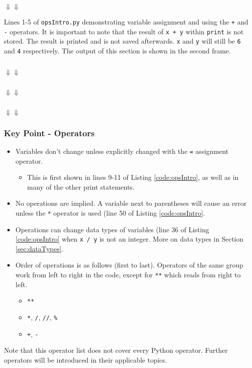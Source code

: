 \documentclass{book}
\newcommand{\pythonAndShellSub}[8]{
\usemintedstyle{autumn}
    \begin{listing}[htb]
 	   \begin{mdframed}[backgroundcolor=codebg]
            \inputminted[firstline=#2, lastline=#3, linenos]{python}{#1}
        \end{mdframed}
        \hspace{5em}$\Downarrow$\hfill$\Downarrow$\hspace{5em}
        \begin{mdframed}[backgroundcolor=codebg]
              
        \end{mdframed}
        \caption{#7}
        \label{#8}
    \end{listing}
}
\begin{document}
\pythonAndShellSub{../../../docCode/chapter2/section1/opsIntro.py}
{1}{11}
{../../../docCode/chapter2/section1/opsIntro.txt}
{1}{6}
{Lines 1-5 of \texttt{opsIntro.py} demonstrating variable assignment and using the \texttt{+} and \texttt{-} operators. It is important to note that the result of \texttt{x + y} within \texttt{print} is not stored. The result is printed and is not saved afterwards. \texttt{x} and \texttt{y} will still be \texttt{6} and \texttt{4} respectively. The output of this section is shown in the second frame.}{pyshell:opsIntroAssign}

\pythonAndShellSub{../../../docCode/chapter2/section1/opsIntro.py}
{12}{19}
{../../../docCode/chapter2/section1/opsIntro.txt}
{7}{10}
{}
{pyshell:opsIntroSubtract}

\pythonAndShellSub{../../../docCode/chapter2/section1/opsIntro.py}
{20}{25}
{../../../docCode/chapter2/section1/opsIntro.txt}
{11}{15}
{}
{pyshell:opsIntroSubtract}

\pythonAndShellSub{../../../docCode/chapter2/section1/opsIntro.py}
{26}{29}
{../../../docCode/chapter2/section1/opsIntro.txt}
{16}{19}
{}
{pyshell:opsIntroSubtract}



\subsubsection*{Key Point - Operators}
\begin{itemize}
\item Variables don't change unless explicitly changed with the \texttt{=} assignment operator.
	\begin{itemize}
	\item This is first shown in lines 9-11 of Listing \ref{code:opsIntro}, as well as in many of the other print statements.
	\end{itemize}
\item No operations are implied. A variable next to parentheses will cause an error unless the \texttt{*} operator is used (line 50 of Listing \ref{code:opsIntro}.
\item Operations can change data types of variables (line 36 of Listing \ref{code:opsIntro} when \texttt{x / y} is not an integer. More on data types in Section \ref{sec:dataTypes}.
\item Order of operations is as follows (first to last). Operators of the same group work from left to right in the code, except for \texttt{**} which reads from right to left.
	\begin{itemize}
	\item[] \texttt{**}
	\item[] \texttt{*}, \texttt{/}, \texttt{//}, \texttt{\%}
	\item[] \texttt{+}, \texttt{-}
	\end{itemize}
\end{itemize}
Note that this operator list does not cover every Python operator. Further operators will be introduced in their applicable topics.
\end{document}
